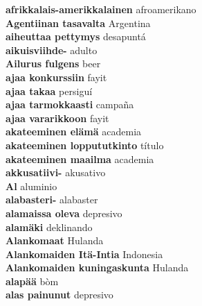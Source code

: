 \textbf{ afrikkalais-amerikkalainen  } afroamerikano \\
\textbf{ Agentiinan tasavalta  } Argentina \\
\textbf{ aiheuttaa pettymys  } desapuntá \\
\textbf{ aikuisviihde-  } adulto \\
\textbf{ Ailurus fulgens  } beer \\
\textbf{ ajaa konkurssiin  } fayit \\
\textbf{ ajaa takaa  } persiguí \\
\textbf{ ajaa tarmokkaasti  } campaña \\
\textbf{ ajaa vararikkoon  } fayit \\
\textbf{ akateeminen elämä  } academia \\
\textbf{ akateeminen loppututkinto  } título \\
\textbf{ akateeminen maailma  } academia \\
\textbf{ akkusatiivi-  } akusativo \\
\textbf{ Al  } aluminio \\
\textbf{ alabasteri-  } alabaster \\
\textbf{ alamaissa oleva  } depresivo \\
\textbf{ alamäki  } deklinando \\
\textbf{ Alankomaat  } Hulanda \\
\textbf{ Alankomaiden Itä-Intia  } Indonesia \\
\textbf{ Alankomaiden kuningaskunta  } Hulanda \\
\textbf{ alapää  } bòm \\
\textbf{ alas painunut  } depresivo \\

